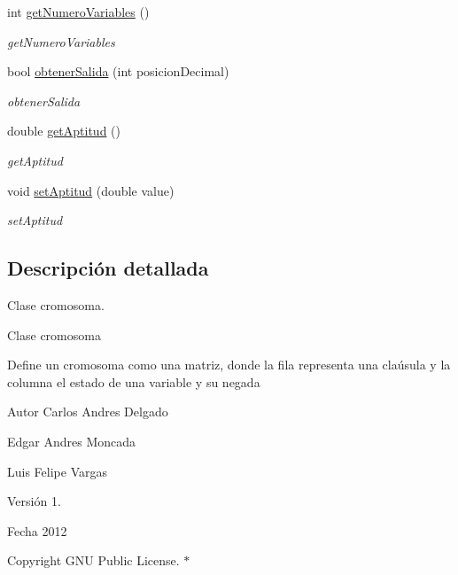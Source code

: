 \begin{DoxyCompactItemize}
int \hyperlink{classCromosoma_a825104a1dd2a7595d119907c84fd2fd1}{get\-Numero\-Variables} ()
\begin{DoxyCompactList}\small\item\em get\-Numero\-Variables \end{DoxyCompactList}\item 
bool \hyperlink{classCromosoma_a8a75eb52e417f9c050c32969b56984e7}{obtener\-Salida} (int posicion\-Decimal)
\begin{DoxyCompactList}\small\item\em obtener\-Salida \end{DoxyCompactList}\item 
double \hyperlink{classCromosoma_a280c8232e95aec0c8dd627cd579abec6}{get\-Aptitud} ()
\begin{DoxyCompactList}\small\item\em get\-Aptitud \end{DoxyCompactList}\item 
void \hyperlink{classCromosoma_a158f2fe672e3232ebf07a5724a15fc2e}{set\-Aptitud} (double value)
\begin{DoxyCompactList}\small\item\em set\-Aptitud \end{DoxyCompactList}\end{DoxyCompactItemize}


\subsection{Descripción detallada}
Clase cromosoma. 

\begin{DoxyVerb}Clase cromosoma
\end{DoxyVerb}


Define un cromosoma como una matriz, donde la fila representa una claúsula y la columna el estado de una variable y su negada \begin{DoxyAuthor}{Autor}
Carlos Andres Delgado 

Edgar Andres Moncada 

Luis Felipe Vargas 
\end{DoxyAuthor}
\begin{DoxyVersion}{Versión}
1. 
\end{DoxyVersion}
\begin{DoxyDate}{Fecha}
2012 
\end{DoxyDate}
\begin{DoxyCopyright}{Copyright}
G\-N\-U Public License. $\ast$ 
\end{DoxyCopyright}


